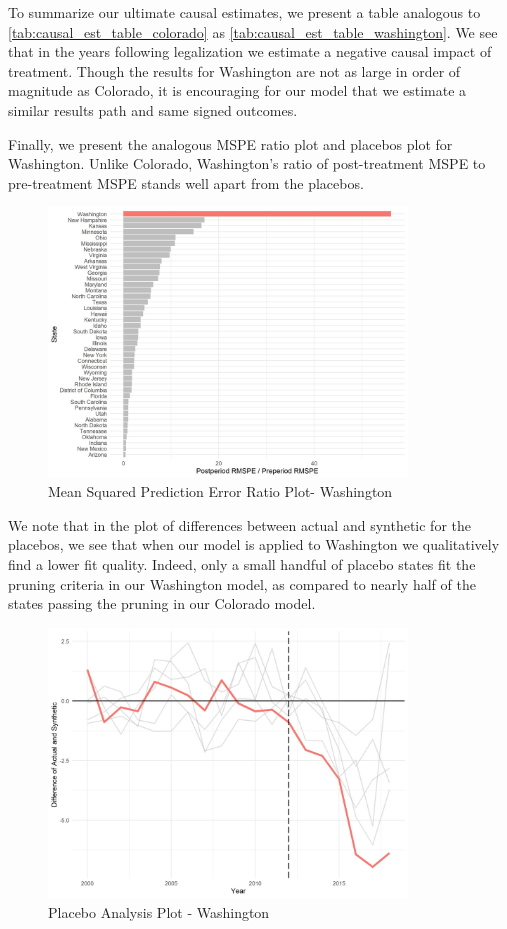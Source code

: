 \documentclass{article}
\begin{document}
To summarize our ultimate causal estimates, we present a table analogous to \ref{tab:causal_est_table_colorado} as \ref{tab:causal_est_table_washington}. We see that in the years following legalization we estimate a negative causal impact of treatment. Though the results for Washington are not as large in order of magnitude as Colorado, it is encouraging for our model that we estimate a similar results path and same signed outcomes.



Finally, we present the analogous MSPE ratio plot and placebos plot for Washington. Unlike Colorado, Washington's ratio of post-treatment MSPE to pre-treatment MSPE stands well apart from the placebos. 

\begin{figure}[H]
	\begin{center}
		\includegraphics[width=0.85\textwidth]{mspe_plot_washington}
	\end{center}
	\caption{Mean Squared Prediction Error Ratio Plot- Washington}
	\label{fig:mspe_plot_washington}
\end{figure}

We note that in the plot of differences between actual and synthetic for the placebos, we see that when our model is applied to Washington we qualitatively find a lower fit quality. Indeed, only a small handful of placebo states fit the pruning criteria in our Washington model, as compared to nearly half of the states  passing the pruning in our Colorado model.

\begin{figure}[H]
	\begin{center}
		\includegraphics[width=0.85\textwidth]{placebos_plot_washington}
	\end{center}
	\caption{Placebo Analysis Plot - Washington}
	\label{fig:placebos_plot_washington}
\end{figure}
\newpage


\end{document}

